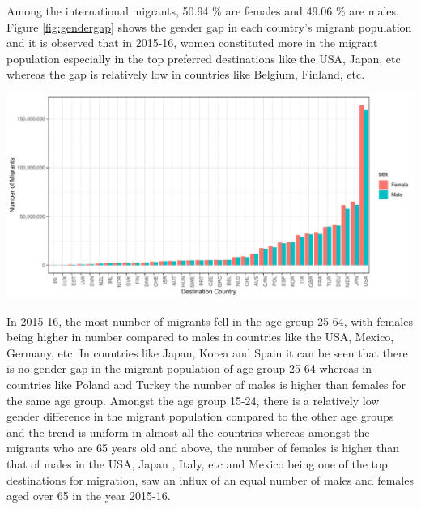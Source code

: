 \documentclass[11pt,a4paper,]{article}
\let\origfigure\figure
\let\endorigfigure\endfigure
\renewenvironment{figure}[1][2] {
    \expandafter\origfigure\expandafter[H]
} {
    \endorigfigure
}%
\begin{document}
Among the international migrants, 50.94 \% are females and 49.06 \% are males. Figure \ref{fig:gendergap} shows the gender gap in each country's migrant population and it is observed that in 2015-16, women constituted more in the migrant population especially in the top preferred destinations like the USA, Japan, etc whereas the gap is relatively low in countries like Belgium, Finland, etc.

\begin{figure}
\centering
\includegraphics{ETC5513assignment4_files/figure-latex/gendergap-1.pdf}
\caption{\label{fig:gendergap}Gender difference in migrant population in countries}
\end{figure}

In 2015-16, the most number of migrants fell in the age group 25-64, with females being higher in number compared to males in countries like the USA, Mexico, Germany, etc. In countries like Japan, Korea and Spain it can be seen that there is no gender gap in the migrant population of age group 25-64 whereas in countries like Poland and Turkey the number of males is higher than females for the same age group.
Amongst the age group 15-24, there is a relatively low gender difference in the migrant population compared to the other age groups and the trend is uniform in almost all the countries whereas amongst the migrants who are 65 years old and above, the number of females is higher than that of males in the USA, Japan , Italy, etc and Mexico being one of the top destinations for migration, saw an influx of an equal number of males and females aged over 65 in the year 2015-16.
\end{document}
